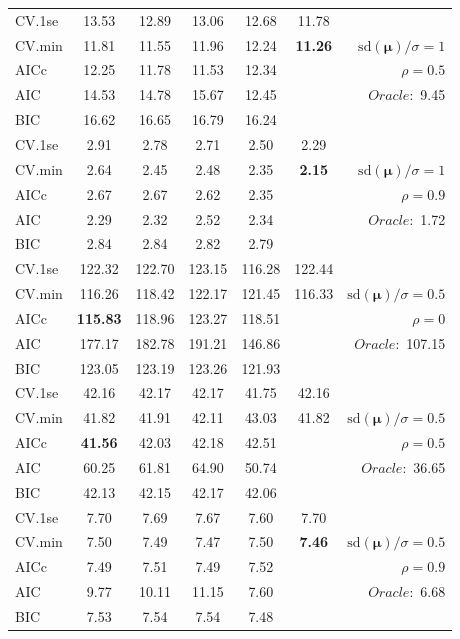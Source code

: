 \begin{table}
\begin{center}
\begin{tabular}{l*{5}{c}|r}
 \hline 
CV.1se & 13.53 & 12.89 & 13.06 & 12.68 & 11.78 & \\
CV.min & 11.81 & 11.55 & 11.96 & 12.24 & {\bf 11.26} &  $\mathrm{sd}(\mathbf{\mu})/\sigma=1$ \\
AICc & 12.25 & 11.78 & 11.53 & 12.34 & & $\rho=0.5$ \\
AIC & 14.53 & 14.78 & 15.67 & 12.45 & &  \multirow{2}{*}{$Oracle: $ 9.45} \\
BIC & 16.62 & 16.65 & 16.79 & 16.24 & &  \\
 \hline 
CV.1se & 2.91 & 2.78 & 2.71 & 2.50 & 2.29 & \\
CV.min & 2.64 & 2.45 & 2.48 & 2.35 & {\bf 2.15} &  $\mathrm{sd}(\mathbf{\mu})/\sigma=1$ \\
AICc & 2.67 & 2.67 & 2.62 & 2.35 & & $\rho=0.9$ \\
AIC & 2.29 & 2.32 & 2.52 & 2.34 & &  \multirow{2}{*}{$Oracle: $ 1.72} \\
BIC & 2.84 & 2.84 & 2.82 & 2.79 & &  \\
 \hline 
CV.1se & 122.32 & 122.70 & 123.15 & 116.28 & 122.44 & \\
CV.min & 116.26 & 118.42 & 122.17 & 121.45 & 116.33 &  $\mathrm{sd}(\mathbf{\mu})/\sigma=0.5$ \\
AICc & {\bf 115.83} & 118.96 & 123.27 & 118.51 & & $\rho=0$ \\
AIC & 177.17 & 182.78 & 191.21 & 146.86 & &  \multirow{2}{*}{$Oracle: $ 107.15} \\
BIC & 123.05 & 123.19 & 123.26 & 121.93 & &  \\
 \hline 
CV.1se & 42.16 & 42.17 & 42.17 & 41.75 & 42.16 & \\
CV.min & 41.82 & 41.91 & 42.11 & 43.03 & 41.82 &  $\mathrm{sd}(\mathbf{\mu})/\sigma=0.5$ \\
AICc & {\bf 41.56} & 42.03 & 42.18 & 42.51 & & $\rho=0.5$ \\
AIC & 60.25 & 61.81 & 64.90 & 50.74 & &  \multirow{2}{*}{$Oracle: $ 36.65} \\
BIC & 42.13 & 42.15 & 42.17 & 42.06 & &  \\
 \hline 
CV.1se & 7.70 & 7.69 & 7.67 & 7.60 & 7.70 & \\
CV.min & 7.50 & 7.49 & 7.47 & 7.50 & {\bf 7.46} &  $\mathrm{sd}(\mathbf{\mu})/\sigma=0.5$ \\
AICc & 7.49 & 7.51 & 7.49 & 7.52 & & $\rho=0.9$ \\
AIC & 9.77 & 10.11 & 11.15 & 7.60 & &  \multirow{2}{*}{$Oracle: $ 6.68} \\
BIC & 7.53 & 7.54 & 7.54 & 7.48 & &  \\
 \hline 
\end{tabular}
\end{center}
\vspace{-1cm}
\end{table}





